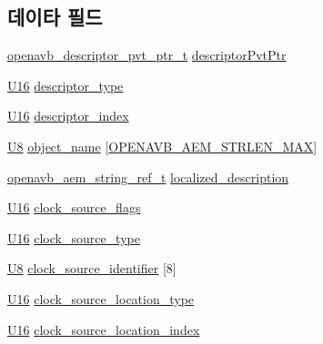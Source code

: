 \subsection*{데이타 필드}
\begin{DoxyCompactItemize}
\item 
\hyperlink{openavb__aem__pub_8h_a85eabab4b7d2466e94c1c3b43b11371d}{openavb\+\_\+descriptor\+\_\+pvt\+\_\+ptr\+\_\+t} \hyperlink{structopenavb__aem__descriptor__clock__source__t_a302e92fd6cf4d398d5305395359fb157}{descriptor\+Pvt\+Ptr}
\item 
\hyperlink{openavb__types__base__pub_8h_a0a0a322d5fa4a546d293a77ba8b4a71f}{U16} \hyperlink{structopenavb__aem__descriptor__clock__source__t_a1e231d7874aada5925b29affc76782cc}{descriptor\+\_\+type}
\item 
\hyperlink{openavb__types__base__pub_8h_a0a0a322d5fa4a546d293a77ba8b4a71f}{U16} \hyperlink{structopenavb__aem__descriptor__clock__source__t_ab26fb363c24b9a2a4391f9171c981b08}{descriptor\+\_\+index}
\item 
\hyperlink{openavb__types__base__pub_8h_aa63ef7b996d5487ce35a5a66601f3e73}{U8} \hyperlink{structopenavb__aem__descriptor__clock__source__t_a5e98aba8105a7a6d82fac41816c83da3}{object\+\_\+name} \mbox{[}\hyperlink{openavb__aem__types__pub_8h_ab2bb82e9f856a76b8305e4864f23ee58}{O\+P\+E\+N\+A\+V\+B\+\_\+\+A\+E\+M\+\_\+\+S\+T\+R\+L\+E\+N\+\_\+\+M\+AX}\mbox{]}
\item 
\hyperlink{structopenavb__aem__string__ref__t}{openavb\+\_\+aem\+\_\+string\+\_\+ref\+\_\+t} \hyperlink{structopenavb__aem__descriptor__clock__source__t_afd613361c59409fb6dcc0c237d1cfbfd}{localized\+\_\+description}
\item 
\hyperlink{openavb__types__base__pub_8h_a0a0a322d5fa4a546d293a77ba8b4a71f}{U16} \hyperlink{structopenavb__aem__descriptor__clock__source__t_aab7224f864f7f7d6ccf7670bb54c3354}{clock\+\_\+source\+\_\+flags}
\item 
\hyperlink{openavb__types__base__pub_8h_a0a0a322d5fa4a546d293a77ba8b4a71f}{U16} \hyperlink{structopenavb__aem__descriptor__clock__source__t_a13c1478145adf7e4fde43228d4e1c3df}{clock\+\_\+source\+\_\+type}
\item 
\hyperlink{openavb__types__base__pub_8h_aa63ef7b996d5487ce35a5a66601f3e73}{U8} \hyperlink{structopenavb__aem__descriptor__clock__source__t_a394c1dcbe9d01a679c5792384523ec6d}{clock\+\_\+source\+\_\+identifier} \mbox{[}8\mbox{]}
\item 
\hyperlink{openavb__types__base__pub_8h_a0a0a322d5fa4a546d293a77ba8b4a71f}{U16} \hyperlink{structopenavb__aem__descriptor__clock__source__t_a4e8fcfd2aeb60d26c446fb8e2648379e}{clock\+\_\+source\+\_\+location\+\_\+type}
\item 
\hyperlink{openavb__types__base__pub_8h_a0a0a322d5fa4a546d293a77ba8b4a71f}{U16} \hyperlink{structopenavb__aem__descriptor__clock__source__t_a6f2828eca9743434c04abedda2e5e70b}{clock\+\_\+source\+\_\+location\+\_\+index}
\end{DoxyCompactItemize}


